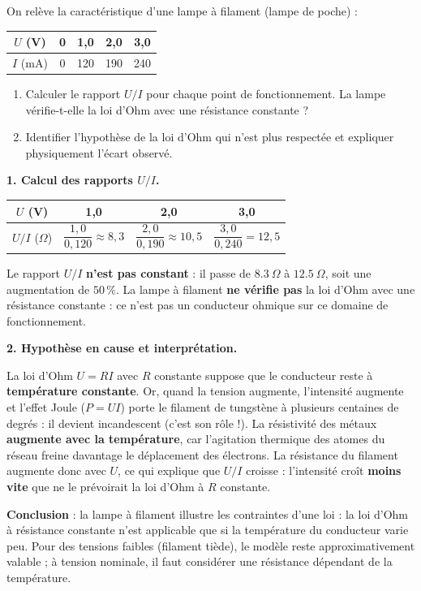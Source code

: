 \documentclass[11pt]{article}
\begin{document}
\begin{exoresolu}
On relève la caractéristique d'une lampe à filament (lampe de poche) :

\begin{center}
\begin{tabular}{|c|cccc|}
\hline
$U$ (V) & 0 & 1,0 & 2,0 & 3,0 \\
\hline
$I$ (mA) & 0 & 120 & 190 & 240 \\
\hline
\end{tabular}
\end{center}

\begin{enumerate}
\item Calculer le rapport $U/I$ pour chaque point de fonctionnement. La lampe vérifie-t-elle la loi d'Ohm avec une résistance constante ?
\item Identifier l'hypothèse de la loi d'Ohm qui n'est plus respectée et expliquer physiquement l'écart observé.
\end{enumerate}
\tcblower
\textbf{1. Calcul des rapports $U/I$.}

\begin{center}
\begin{tabular}{|c|ccc|}
\hline
$U$ (V) & 1,0 & 2,0 & 3,0 \\
\hline
$U/I$ ($\Omega$) & $\dfrac{1,0}{0,120} \approx 8,3$ & $\dfrac{2,0}{0,190} \approx 10,5$ & $\dfrac{3,0}{0,240} = 12,5$ \\
\hline
\end{tabular}
\end{center}

Le rapport $U/I$ \textbf{n'est pas constant} : il passe de $\SI{8,3}{\Omega}$ à $\SI{12,5}{\Omega}$, soit une augmentation de $50\,\%$. La lampe à filament \textbf{ne vérifie pas} la loi d'Ohm avec une résistance constante : ce n'est pas un conducteur ohmique sur ce domaine de fonctionnement.

\textbf{2. Hypothèse en cause et interprétation.}

La loi d'Ohm $U = RI$ avec $R$ constante suppose que le conducteur reste à \textbf{température constante}. Or, quand la tension augmente, l'intensité augmente et l'effet Joule ($P = UI$) porte le filament de tungstène à plusieurs centaines de degrés : il devient incandescent (c'est son rôle !). La résistivité des métaux \textbf{augmente avec la température}, car l'agitation thermique des atomes du réseau freine davantage le déplacement des électrons. La résistance du filament augmente donc avec $U$, ce qui explique que $U/I$ croisse : l'intensité croît \textbf{moins vite} que ne le prévoirait la loi d'Ohm à $R$ constante.

\textbf{Conclusion} : la lampe à filament illustre les contraintes d'une loi : la loi d'Ohm à résistance constante n'est applicable que si la température du conducteur varie peu. Pour des tensions faibles (filament tiède), le modèle reste approximativement valable ; à tension nominale, il faut considérer une résistance dépendant de la température.
\end{exoresolu}
\end{document}
